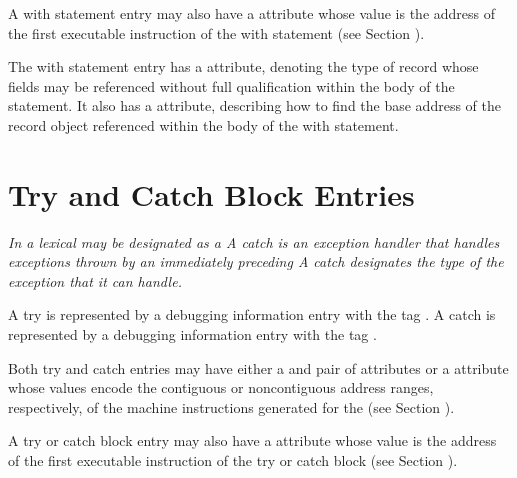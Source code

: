 A 
\hypertarget{chap:DWATentrypcofwithstmt}{}
with statement entry may also have 
a 
\DWATentrypc{} attribute
whose value is the address of the first executable instruction
of the with statement (see 
Section ).

The with statement entry has 
a \DWATtype{} attribute, denoting
the type of record whose fields may be referenced without full
qualification within the body of the statement. It also has
a \DWATlocation{} attribute, describing how to find the base
address of the record object referenced within the body of
the with statement.

\section{Try and Catch Block Entries}
\label{chap:tryandcatchblockentries}

\textit{In  a lexical  may be 
designated as a  
A catch  is an 
exception handler that handles
exceptions thrown by an immediately 
preceding 
A catch  
designates the type of the exception that it
can handle.}

A try  is represented 
by a debugging information entry
with the tag \DWTAGtryblockTARG.  
A catch  is represented by
a debugging information entry with 
the tag \DWTAGcatchblockTARG.

Both try and catch  entries may have either a
\DWATlowpc{} and 
\DWAThighpc{} pair of attributes 
or 
a
\DWATranges{} attribute 
whose values encode the contiguous
or non\dash contiguous address ranges, respectively, of the
machine instructions generated for the 
(see Section
).

A 
\hypertarget{chap:DWATentrypcoftryblock}{}
\hypertarget{chap:DWATentrypcofcatchblock}{}
try or catch block entry may also have 
a 
\DWATentrypc{} attribute
whose value is the address of the first executable instruction
of the try or catch block (see 
Section ).

